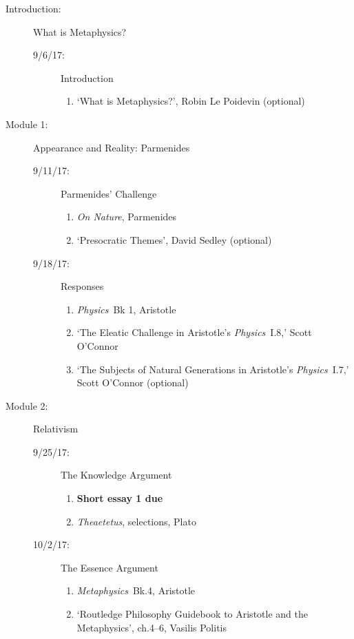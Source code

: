 \documentclass[article,oneside]{memoir}
\begin{document}
\begin{description}
\item[Introduction:]  What  is Metaphysics? 
\begin{description}
\item [9/6/17:] Introduction
\begin{enumerate}
\item `What is Metaphysics?', Robin Le Poidevin (optional)
\end{enumerate}
\end{description}

\item[Module 1:] Appearance and Reality: Parmenides 
\begin{description}
\item [9/11/17:] Parmenides' Challenge
\begin{enumerate}
\item \emph{On Nature}, Parmenides
\item `Presocratic Themes', David Sedley (optional)
\end{enumerate}

\item [9/18/17:] Responses 
\begin{enumerate}
\item \emph{Physics}\ Bk 1, Aristotle
\item `The Eleatic Challenge in Aristotle's \emph{Physics}\ I.8,' Scott O'Connor 
\item `The Subjects of Natural Generations in Aristotle's \emph{Physics}\ I.7,' Scott O'Connor (optional)
\end{enumerate}
\end{description}

\item[Module 2:] Relativism
\begin{description}
\item [9/25/17:] The Knowledge Argument
\begin{enumerate}
\item \textbf{Short essay 1 due}
\item \emph{Theaetetus}, selections, Plato
\end{enumerate}

\item[10/2/17:] The Essence Argument
\begin{enumerate}
\item \emph{Metaphysics}\ Bk.4, Aristotle
\item `Routledge Philosophy Guidebook to Aristotle and the Metaphysics', ch.4--6, Vasilis Politis
\end{enumerate}


\end{description}
\end{description}
\end{document}
